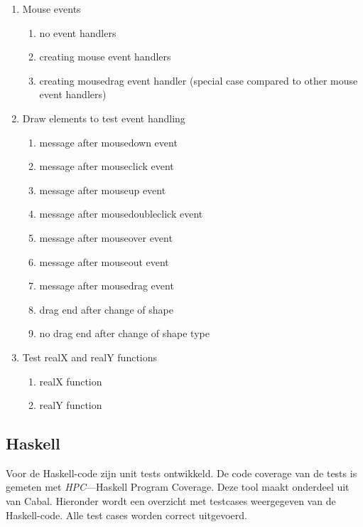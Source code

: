 \begin{enumerate}[label={T\arabic*}]
	\item \label{test:js:mouse} Mouse events
	\begin{enumerate}[label={T\arabic{enumi}.\arabic*}]
		\item \label{test:js:mouse:no} no event handlers
		\item \label{test:js:mouse:create} creating mouse event handlers
		\item \label{test:js:mouse:drag} creating mousedrag event handler (special case compared to other mouse event handlers)
	\end{enumerate}
	\item \label{test:js:mouse:draw} Draw elements to test event handling
	\begin{enumerate}[label={T\arabic{enumi}.\arabic*}]
		\item \label{test:js:draw:mousedown} message after mousedown event
		\item \label{test:js:draw:mouseclick} message after mouseclick event
		\item \label{test:js:draw:mouseup} message after mouseup event
		\item \label{test:js:draw:mousedoubleclick} message after mousedoubleclick event
		\item \label{test:js:draw:mouseover} message after mouseover event
		\item \label{test:js:draw:mouseout} message after mouseout event
		\item \label{test:js:draw:mousedrag} message after mousedrag event
		\item \label{test:js:draw:mousedragend} drag end after change of shape
		\item \label{test:js:draw:mousenodragend} no drag end after change of shape type
	\end{enumerate}
	\item Test realX and realY functions
	\begin{enumerate}[label={T\arabic{enumi}.\arabic*}]
		\item \label{test:js:func:realX} realX function
		\item \label{test:js:func:realY} realY function
	\end{enumerate}
	\setcounter{startvaluetest}{\value{enumi}}
\end{enumerate}

\subsection{Haskell}
Voor de Haskell-code zijn unit tests ontwikkeld. De code coverage van de tests is gemeten met \emph{HPC}—Haskell Program Coverage\cite{HPC}. Deze tool maakt onderdeel uit van Cabal.
Hieronder wordt een overzicht met testcases weergegeven van de Haskell-code. Alle test cases worden correct uitgevoerd.


